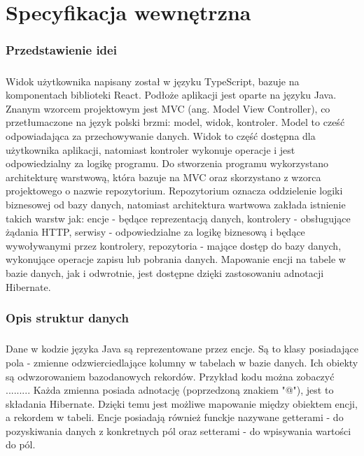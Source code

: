 \chapter{Specyfikacja wewnętrzna}
\label{ch:05}

\subsection{Przedstawienie idei}
\paragraph{}
Widok użytkownika napisany został w języku TypeScript, bazuje na komponentach biblioteki React. Podłoże aplikacji jest oparte na języku Java. Znanym wzorcem projektowym jest MVC (ang. Model View Controller), co przetłumaczone na język polski brzmi: model, widok, kontroler. Model to cześć odpowiadająca za przechowywanie danych. Widok to część dostępna dla użytkownika aplikacji, natomiast kontroler wykonuje operacje i jest odpowiedzialny za logikę programu. Do stworzenia programu wykorzystano architekturę warstwową, która bazuje na MVC oraz skorzystano z wzorca projektowego o nazwie repozytorium. Repozytorium oznacza oddzielenie logiki biznesowej od bazy danych, natomiast architektura wartwowa zakłada istnienie takich warstw jak: encje - będące reprezentacją danych, kontrolery - obsługujące żądania HTTP, serwisy - odpowiedzialne za logikę biznesową i będące wywoływanymi przez kontrolery, repozytoria - mające dostęp do bazy danych, wykonujące operacje zapisu lub pobrania danych. Mapowanie encji na tabele w bazie danych, jak i odwrotnie, jest dostępne dzięki zastosowaniu adnotacji Hibernate.

\subsection{Opis struktur danych}
\paragraph{}
Dane w kodzie języka Java są reprezentowane przez encje. Są to klasy posiadające pola - zmienne odzwierciedlające kolumny w tabelach w bazie danych. Ich obiekty są odwzorowaniem bazodanowych rekordów. Przykład kodu można zobaczyć ......... Każda zmienna posiada adnotację (poprzedzoną znakiem "@"), jest to składania Hibernate. Dzięki temu jest możliwe mapowanie między obiektem encji, a rekordem w tabeli. Encje posiadają również funckje nazywane getterami - do pozyskiwania danych z konkretnych pól oraz setterami - do wpisywania wartości do pól.

